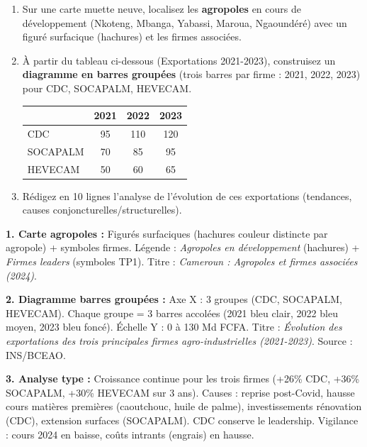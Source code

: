 \documentclass[11pt]{article}
\begin{document}
\begin{exercice}
\begin{enumerate}
    \item Sur une carte muette neuve, localisez les \textbf{agropoles} en cours de développement (Nkoteng, Mbanga, Yabassi, Maroua, Ngaoundéré) avec un figuré surfacique (hachures) et les firmes associées.
    \item À partir du tableau ci-dessous (Exportations 2021-2023), construisez un \textbf{diagramme en barres groupées} (trois barres par firme : 2021, 2022, 2023) pour CDC, SOCAPALM, HEVECAM.
    \begin{center}
    \begin{tabular}{|l|c|c|c|}\hline
    \rowcolor{popblueL}
     & 2021 & 2022 & 2023 \\ \hline
    CDC & 95 & 110 & 120 \\ \hline
    SOCAPALM & 70 & 85 & 95 \\ \hline
    HEVECAM & 50 & 60 & 65 \\ \hline
    \end{tabular}
    \end{center}
    \item Rédigez en 10 lignes l'analyse de l'évolution de ces exportations (tendances, causes conjoncturelles/structurelles).
\end{enumerate}
\end{exercice}

\begin{corrige}
\textbf{1. Carte agropoles :} Figurés surfaciques (hachures couleur distincte par agropole) + symboles firmes. Légende : \emph{Agropoles en développement} (hachures) + \emph{Firmes leaders} (symboles TP1). Titre : \emph{Cameroun : Agropoles et firmes associées (2024)}.\par
\textbf{2. Diagramme barres groupées :} Axe X : 3 groupes (CDC, SOCAPALM, HEVECAM). Chaque groupe = 3 barres accolées (2021 bleu clair, 2022 bleu moyen, 2023 bleu foncé). Échelle Y : 0 à 130 Md FCFA. Titre : \emph{Évolution des exportations des trois principales firmes agro-industrielles (2021-2023)}. Source : INS/BCEAO.\par
\textbf{3. Analyse type :} Croissance continue pour les trois firmes (+26\% CDC, +36\% SOCAPALM, +30\% HEVECAM sur 3 ans). Causes : reprise post-Covid, hausse cours matières premières (caoutchouc, huile de palme), investissements rénovation (CDC), extension surfaces (SOCAPALM). CDC conserve le leadership. Vigilance : cours 2024 en baisse, coûts intrants (engrais) en hausse.
\end{corrige}
\end{document}
